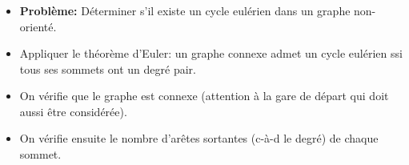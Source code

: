 \begin{frame}
    \frametitle{\problemtitle}
    \begin{itemize}
        \item<+-> \textbf{Problème:} Déterminer s'il existe un cycle eulérien dans un graphe non-orienté.
        \item<+-> Appliquer le théorème d'Euler: un graphe connexe admet un cycle eulérien ssi tous ses sommets ont un degré pair.
        \item<+-> On vérifie que le graphe est connexe (attention à la gare de départ qui doit aussi être considérée).
        \item<+-> On vérifie ensuite le nombre d'arêtes sortantes (c-à-d le degré) de chaque sommet.
    \end{itemize}
\end{frame}
